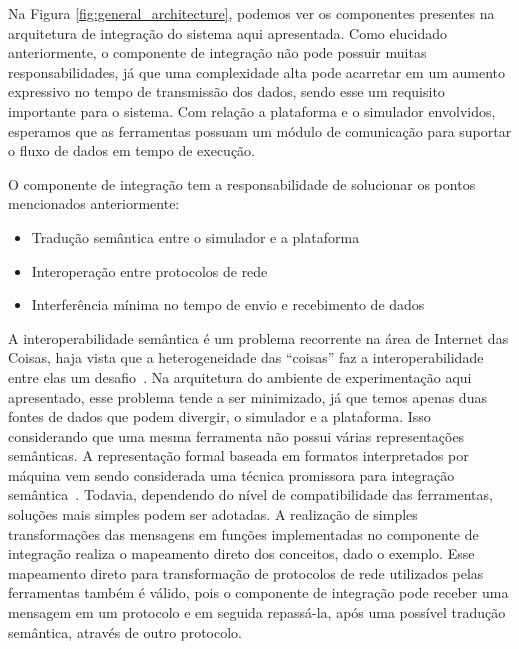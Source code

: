 Na Figura \ref{fig:general_architecture}, podemos ver os componentes presentes na arquitetura de integração do sistema aqui apresentada.
Como elucidado anteriormente, o componente de integração não pode possuir muitas responsabilidades, já que uma complexidade alta pode acarretar em um aumento expressivo no
tempo de transmissão dos dados, sendo esse um requisito importante para o sistema.
Com relação a plataforma e o simulador envolvidos, esperamos que as ferramentas possuam um módulo de comunicação para suportar o fluxo de dados em tempo de execução.

O componente de integração tem a responsabilidade de solucionar os pontos mencionados anteriormente:

\begin{itemize}
    \item Tradução semântica entre o simulador e a plataforma

    \item Interoperação entre protocolos de rede

    \item Interferência mínima no tempo de envio e recebimento de dados
\end{itemize}

A interoperabilidade semântica é um problema recorrente na área de Internet das Coisas, haja vista que a heterogeneidade das ``coisas'' faz a interoperabilidade entre elas um desafio~\citep{barnaghi_2012}.
Na arquitetura do ambiente de experimentação aqui apresentado, esse problema tende a ser minimizado, já que temos apenas duas fontes de dados que podem divergir, o simulador e a plataforma.
Isso considerando que uma mesma ferramenta não possui várias representações semânticas.
A representação formal baseada em formatos interpretados por máquina vem sendo considerada uma técnica promissora para integração semântica~\citep{barnaghi_2012}.
Todavia, dependendo do nível de compatibilidade das ferramentas, soluções mais simples podem ser adotadas.
A realização de simples transformações das mensagens em funções implementadas no componente de integração realiza o mapeamento direto dos conceitos, dado o exemplo.
Esse mapeamento direto para transformação de protocolos de rede utilizados pelas ferramentas também é válido, pois o componente de integração pode receber uma mensagem em um protocolo e em seguida repassá-la, 
após uma possível tradução semântica, através de outro protocolo.

